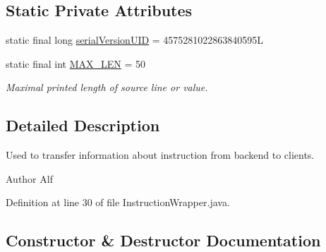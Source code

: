 \subsection*{Static Private Attributes}
\begin{DoxyCompactItemize}
\item 
static final long \hyperlink{classgov_1_1nasa_1_1jpf_1_1inspector_1_1utils_1_1_instruction_wrapper_add18559946216bb05c793c23c049792b}{serial\+Version\+U\+ID} = 4575281022863840595L
\item 
static final int \hyperlink{classgov_1_1nasa_1_1jpf_1_1inspector_1_1utils_1_1_instruction_wrapper_acaabd2d0ac4fb7be6ea6a3568617e943}{M\+A\+X\+\_\+\+L\+EN} = 50
\begin{DoxyCompactList}\small\item\em Maximal printed length of source line or value. \end{DoxyCompactList}\end{DoxyCompactItemize}


\subsection{Detailed Description}
Used to transfer information about instruction from backend to clients. 

\begin{DoxyAuthor}{Author}
Alf 
\end{DoxyAuthor}


Definition at line 30 of file Instruction\+Wrapper.\+java.



\subsection{Constructor \& Destructor Documentation}
